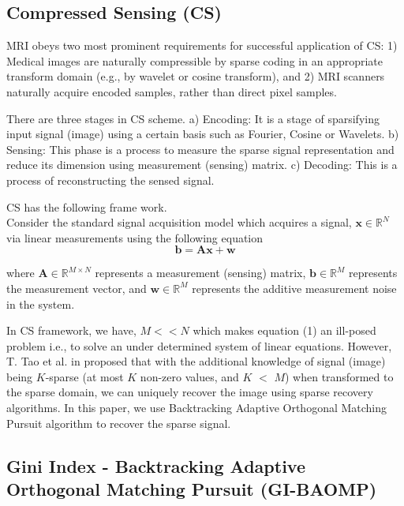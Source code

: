 \documentclass[11pt,conference]{IEEEtran}
\begin{document}
\subsection{Compressed Sensing (CS)}
MRI obeys two most prominent requirements for successful application of CS\cite{csmri}: 1) Medical images are naturally compressible by sparse coding in an appropriate transform domain (e.g., by wavelet or cosine transform), and 2) MRI scanners naturally acquire encoded samples, rather than direct pixel samples.

\par There are three stages in CS scheme. a) Encoding: It is a stage of sparsifying input signal (image) using a certain basis such as Fourier, Cosine or Wavelets. b) Sensing: This phase is a process to measure the sparse signal representation and reduce its dimension using measurement (sensing) matrix. c) Decoding: This is a process of reconstructing the sensed signal.

\par CS has the following frame work. \\
Consider the standard signal acquisition model which acquires a signal, $\mathbf{x} \in \mathbb{R}^N$ via linear measurements using the following equation
\begin{equation}
 \label{Eqn:CS}
 \mathbf{b} = \mathbf{Ax} + \mathbf{w}
\end{equation}  

where $\mathbf{A} \in \mathbb{R}^{M\times N}$ represents a measurement (sensing) matrix, $\mathbf{b} \in \mathbb{R}^M$ represents the measurement vector, and $\mathbf{w} \in \mathbb{R}^M$ represents the additive measurement noise in the system.

\par In CS framework, we have, $M<<N$ which makes equation (1) an ill-posed problem i.e., to solve an under determined system of linear equations. However, T. Tao et al. in \cite{ejt} proposed that with the additional knowledge of signal (image) being $K$-sparse (at most $K$ non-zero values, and $K$ $<$ $M$) when transformed to the sparse domain, we can uniquely recover the image using sparse recovery algorithms. In this paper, we use Backtracking Adaptive Orthogonal Matching Pursuit algorithm to recover the sparse signal.


\subsection{Gini Index - Backtracking Adaptive Orthogonal Matching Pursuit (GI-BAOMP) }
\end{document}

